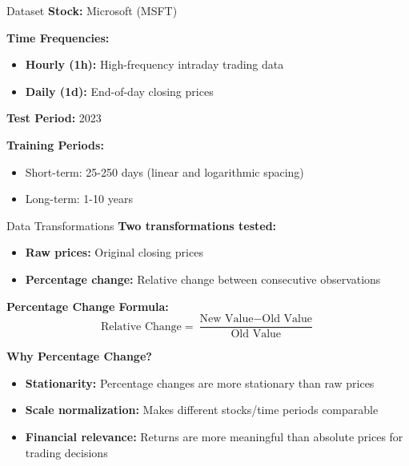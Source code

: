 \documentclass[aspectratio=169]{beamer}
\begin{document}
\begin{frame}{Dataset}
\textbf{Stock:} Microsoft (MSFT)

\vspace{1em}

\textbf{Time Frequencies:}
\begin{itemize}
\item \textbf{Hourly (1h):} High-frequency intraday trading data
\item \textbf{Daily (1d):} End-of-day closing prices
\end{itemize}

\vspace{1em}

\textbf{Test Period:} 2023

\vspace{1em}

\textbf{Training Periods:}
\begin{itemize}
\item Short-term: 25-250 days (linear and logarithmic spacing)
\item Long-term: 1-10 years
\end{itemize}
\end{frame}

\begin{frame}{Data Transformations}
\textbf{Two transformations tested:}
\begin{itemize}
\item \textbf{Raw prices:} Original closing prices
\item \textbf{Percentage change:} Relative change between consecutive observations
\end{itemize}

\vspace{1em}

\textbf{Percentage Change Formula:}
\[
\text{Relative Change} = \frac{\text{New Value} - \text{Old Value}}{\text{Old Value}}
\]

\vspace{1em}

\textbf{Why Percentage Change?}
\begin{itemize}
\item \textbf{Stationarity:} Percentage changes are more stationary than raw prices
\item \textbf{Scale normalization:} Makes different stocks/time periods comparable
\item \textbf{Financial relevance:} Returns are more meaningful than absolute prices for trading decisions
\end{itemize}
\end{frame}
\end{document}

